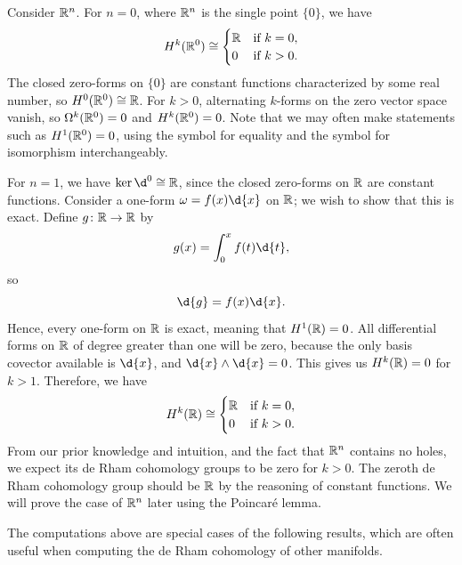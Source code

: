 \documentclass[a4paper,12pt]{article}
\begin{document}
\begin{example}
    Consider $\mathbb{R}^n$.
    For $n = 0$, where $\mathbb{R}^n$ is the single point $\{0\}$, we have
    \begin{equation}
        H^k(\mathbb{R}^0) \cong \begin{cases}
            \mathbb{R} & \text{if } k = 0, \\
            0 & \text{if } k > 0.
        \end{cases}
    \end{equation}
    The closed zero-forms on $\{0\}$ are constant functions characterized by some real number, so $H^0(\mathbb{R}^0) \cong \mathbb{R}$.
    For $k > 0$, alternating $k$-forms on the zero vector space vanish, so $\Omega^k(\mathbb{R}^0) = 0$ and $H^k(\mathbb{R}^0) = 0$.
    Note that we may often make statements such as $H^1(\mathbb{R}^0) = 0$, using the symbol for equality and the symbol for isomorphism interchangeably.

    For $n = 1$, we have $\ker \d^0 \cong \R$, since the closed zero-forms on $\mathbb{R}$ are constant functions.
    Consider a one-form $\omega = f(x) \d{x}$ on $\mathbb{R}$; we wish to show that this is exact.
    Define $g \colon \mathbb{R} \to \mathbb{R}$ by
    \begin{equation}
        g(x) = \int_0^x f(t) \d{t},
    \end{equation}
    so
    \begin{equation}
        \d{g} = f(x) \d{x}.
    \end{equation}
    Hence, every one-form on $\mathbb{R}$ is exact, meaning that $H^1(\mathbb{R}) = 0$.
    All differential forms on $\mathbb{R}$ of degree greater than one will be zero, because the only basis covector available is $\d{x}$, and $\d{x} \wedge \d{x} = 0$.
    This gives us $H^k(\mathbb{R}) = 0$ for $k > 1$.
    Therefore, we have
    \begin{equation}
        H^k(\mathbb{R}) \cong \begin{cases}
            \mathbb{R} & \text{if } k = 0, \\
            0 & \text{if } k > 0.
        \end{cases}
    \end{equation}
    From our prior knowledge and intuition, and the fact that $\mathbb{R}^n$ contains no holes, we expect its de Rham cohomology groups to be zero for $k > 0$.
    The zeroth de Rham cohomology group should be $\mathbb{R}$ by the reasoning of constant functions.
    We will prove the case of $\mathbb{R}^n$ later using the Poincar\'{e} lemma.
\end{example}
The computations above are special cases of the following results, which are often useful when computing the de Rham cohomology of other manifolds.
\end{document}
